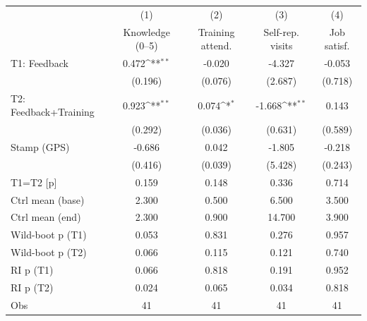 {
\def\sym#1{\ifmmode^{#1}\else\(^{#1}\)\fi}
\begin{tabular}{l*{4}{c}}
\toprule
                    &\multicolumn{1}{c}{(1)}&\multicolumn{1}{c}{(2)}&\multicolumn{1}{c}{(3)}&\multicolumn{1}{c}{(4)}\\
                    &\multicolumn{1}{c}{Knowledge (0--5)}&\multicolumn{1}{c}{Training attend.}&\multicolumn{1}{c}{Self-rep. visits}&\multicolumn{1}{c}{Job satisf.}\\
\midrule
T1: Feedback        &       0.472\sym{**} &      -0.020         &      -4.327         &      -0.053         \\
                    &     (0.196)         &     (0.076)         &     (2.687)         &     (0.718)         \\
T2: Feedback+Training&       0.923\sym{**} &       0.074\sym{*}  &      -1.668\sym{**} &       0.143         \\
                    &     (0.292)         &     (0.036)         &     (0.631)         &     (0.589)         \\
Stamp (GPS)         &      -0.686         &       0.042         &      -1.805         &      -0.218         \\
                    &     (0.416)         &     (0.039)         &     (5.428)         &     (0.243)         \\
\midrule
T1=T2 [p]           &       0.159         &       0.148         &       0.336         &       0.714         \\
Ctrl mean (base)    &       2.300         &       0.500         &       6.500         &       3.500         \\
Ctrl mean (end)     &       2.300         &       0.900         &      14.700         &       3.900         \\
Wild-boot p (T1)    &       0.053         &       0.831         &       0.276         &       0.957         \\
Wild-boot p (T2)    &       0.066         &       0.115         &       0.121         &       0.740         \\
RI p (T1)           &       0.066         &       0.818         &       0.191         &       0.952         \\
RI p (T2)           &       0.024         &       0.065         &       0.034         &       0.818         \\
Obs                 &          41         &          41         &          41         &          41         \\
\bottomrule
\end{tabular}
}
